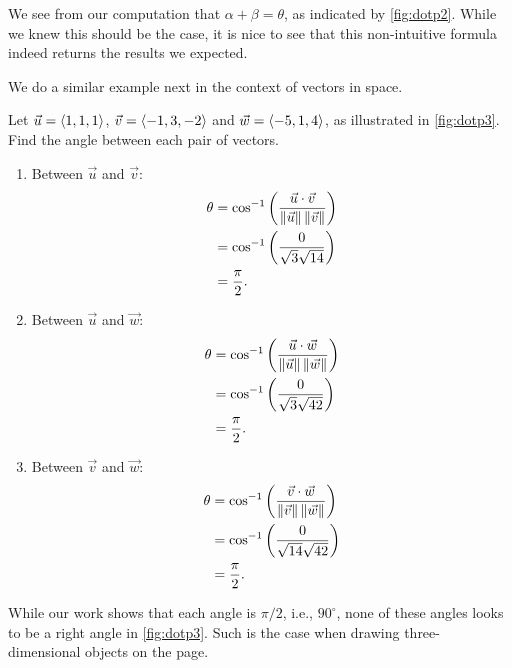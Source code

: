 We see from our computation that $\alpha + \beta = \theta$, as indicated by \autoref{fig:dotp2}. While we knew this should be the case, it is nice to see that this non-intuitive formula indeed returns the results we expected.

We do a similar example next in the context of vectors in space.


\begin{example}\label{ex_dotp3}%
Let $\vec u = \left\langle 1,1,1\right\rangle$, $\vec v = \left\langle -1,3,-2\right\rangle$ and $\vec w = \left\langle -5,1,4\right\rangle$, as illustrated in \autoref{fig:dotp3}. Find the angle between each pair of vectors.
\solution
\begin{enumerate}
	\item Between $\vec u$ and $\vec v$:\vspace{-\baselineskip}
	\begin{align*}
		\theta &= \cos^{-1}\left(\frac{\vec u\cdot\vec v}{\left\lVert \vec u \right\rVert\left\lVert \vec v \right\rVert}\right)\\
		&= \cos^{-1}\left(\frac{0}{\sqrt{3}\sqrt{14}}\right)\\
		&= \frac{\pi}2.
	\end{align*}
	\item	Between $\vec u$ and $\vec w$:\vspace{-\baselineskip}
	\begin{align*}
		\theta &= \cos^{-1}\left(\frac{\vec u\cdot\vec w}{\left\lVert \vec u \right\rVert\left\lVert \vec w \right\rVert}\right)\\
		&= \cos^{-1}\left(\frac{0}{\sqrt{3}\sqrt{42}}\right)\\
		&= \frac{\pi}2.
	\end{align*}
	\item	Between $\vec v$ and $\vec w$:\vspace{-\baselineskip}
	\begin{align*}
		\theta &= \cos^{-1}\left(\frac{\vec v\cdot\vec w}{\left\lVert \vec v \right\rVert\left\lVert \vec w \right\rVert}\right)\\
		&= \cos^{-1}\left(\frac{0}{\sqrt{14}\sqrt{42}}\right)\\
		&= \frac{\pi}2.
	\end{align*}
\end{enumerate}
While our work shows that each angle is $\pi/2$, i.e.,  $90^\circ$, none of these angles looks to be a right angle in \autoref{fig:dotp3}. Such is the case when drawing three-dimensional objects on the page.
\end{example}

